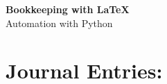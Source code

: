 \documentclass[a4paper, 10pt]{article}
\begin{document}
	
	\begin{center}
		{\bfseries\LARGE Bookkeeping with \LaTeX{}} \\ \medskip
		{\LARGE Automation with Python}
	\end{center}
	
	\section{Journal Entries:}
	
	
\end{document}
